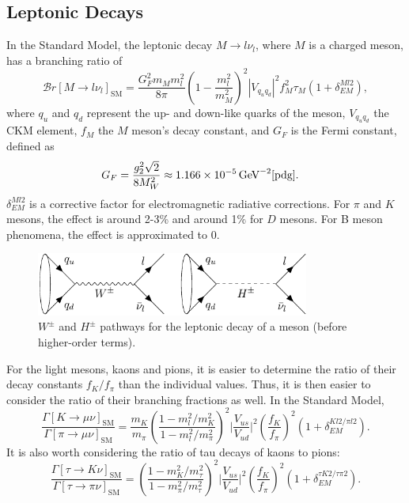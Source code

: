 \documentclass[a4paper,12pt]{article}
\begin{document}
\subsection{Leptonic Decays}
\label{subsec:lep}
In the Standard Model, the leptonic decay $M\to l\nu_l$, where $M$ is a charged meson, has a branching ratio of
\begin{equation}
    \label{eq:mlv}
    \mathcal{B}r[M\to l\nu_l]_{\text{SM}} = \frac{G_F^2m_Mm_l^2}{8\pi}\left(1-\frac{m_l^2}{m_M^2}\right)^2 |V_{q_uq_d}|^2f_M^2\tau_M(1+\delta_{EM}^{Ml2}),
\end{equation}
where $q_u$ and $q_d$ represent the up- and down-like quarks of the meson, $V_{q_uq_d}$ the CKM element, $f_M$ the $M$ meson's decay constant, and $G_F$ is the Fermi constant, defined as
\begin{align}
    G_F &= \frac{g_2^2\sqrt{2}}{8M_W^2} \approx 1.166\times10^{-5}\,\text{GeV}^{-2} \cite{pdg}.
\end{align}
$\delta_{EM}^{Ml2}$ is a corrective factor for electromagnetic radiative corrections. 
For $\pi$ and $K$ mesons, the effect is around 2-3\% and around 1\% for $D$ mesons.
For B meson phenomena, the effect is approximated to 0. 
\begin{figure}[ht]
    \centering
    \includegraphics[width=0.8\textwidth]{mesons.pdf}
    \caption{\label{fig:mesons}$W^\pm$ and $H^\pm$ pathways for the leptonic decay of a meson (before higher-order terms).}
\end{figure}
For the light mesons, kaons and pions, it is easier to determine the ratio of their decay constants $f_K/f_\pi$ than the individual values.
Thus, it is then easier to consider the ratio of their branching fractions as well. 
In the Standard Model, 
\begin{equation}
    \label{eq:kpi}
    \frac{\Gamma[K\to\mu\nu]_{\text{SM}}}{\Gamma[\pi\to\mu\nu]_{\text{SM}}} = \frac{m_K}{m_\pi}\left(\frac{1-m_l^2/m_K^2}{1-m_l^2/m_\pi^2}\right)^2 \bigg|\frac{V_{us}}{V_{ud}}\bigg|^2\left(\frac{f_K}{f_\pi}\right)^2(1+\delta^{Kl2/\pi l2}_{EM}).
\end{equation}
It is also worth considering the ratio of tau decays of kaons to pions:
\begin{equation}
    \label{ep:tkpi}
    \frac{\Gamma[\tau\to K\nu]_{\text{SM}}}{\Gamma[\tau\to\pi\nu]_{\text{SM}}} = \left(\frac{1-m_K^2/m_\tau^2}{1-m_\pi^2/m_\tau^2}\right)^2\bigg|\frac{V_{us}}{V_{ud}}\bigg|^2\left(\frac{f_K}{f_\pi}\right)^2(1+\delta_{EM}^{\tau K2/\tau\pi2}).
\end{equation}
\end{document}
